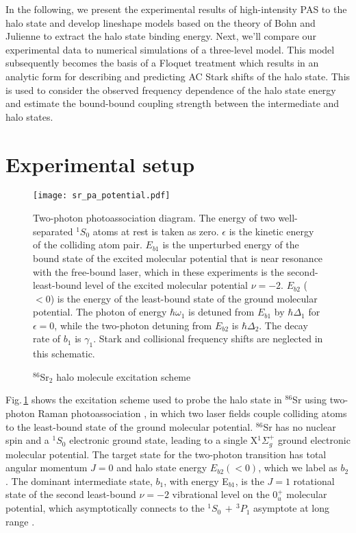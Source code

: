 In the following, we present the experimental results of high-intensity PAS to the halo state and develop lineshape models based on the theory of Bohn and Julienne to extract the halo state binding energy.
Next, we'll compare our experimental data to numerical simulations of a three-level model.
This model subsequently becomes the basis of a Floquet treatment which results in an analytic form for describing and predicting AC Stark shifts of the halo state.
This is used to consider the observed frequency dependence of the halo state energy and estimate the bound-bound coupling strength between the intermediate and halo states.

\section{Experimental setup} \label{sec:highE_methods}
	\begin{figure} 
	\centerline{
	  \texttt{[image: sr\_pa\_potential.pdf]}}
	  \caption{$^{86}$Sr$_2$ halo molecule excitation scheme}{Two-photon photoassociation diagram. The energy of two well-separated $^1S_0$ atoms at rest is taken as zero. $\epsilon$ is the kinetic energy of the colliding atom pair. $E_{b1}$ is the unperturbed energy of the bound state of the excited molecular potential that is near resonance with the free-bound laser, which in these experiments is the second-least-bound level of the excited molecular potential $\nu=-2$. $E_{b2}$ ($<0$) is the energy of the least-bound state of the ground molecular potential. The photon of energy $\hbar \omega_1$ is detuned from $E_{b1}$ by $\hbar \Delta_1$ for $\epsilon=0$, while the two-photon detuning from $E_{b2}$ is $\hbar \Delta_2$. The decay rate of $b_1$ is $\gamma_1$. Stark and collisional frequency shifts are neglected in this schematic.}
	  \label{fig:PASDiagram}
	\end{figure}
Fig.\,\ref{fig:PASDiagram} shows the excitation scheme used to probe the halo state in $^{86}$Sr using two-photon Raman photoassociation \cite{Jones2006}, in which two laser fields couple colliding atoms to the least-bound state of the ground molecular potential. 
$^{86}$Sr has no nuclear spin and a $^1S_0$ electronic ground state, leading to a single X$^1\Sigma_g^+$ ground electronic molecular potential.
The target state for the two-photon transition has total angular momentum $J=0$ and halo state energy $E_{b2}(<0)$, which we label as $b_2$.
The dominant intermediate state, $b_1$, with energy E$_{b1}$, is the $J=1$ rotational state of the second least-bound $\nu=-2$ vibrational level on the $0^+_u$ molecular potential, which asymptotically connects to the $^1S_0\,+\,^3P_1$ asymptote at long range \cite{MartinezDeEscobar2008}.
